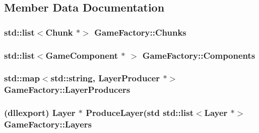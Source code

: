 \subsection{Member Data Documentation}
\hypertarget{class_game_factory_a77496a7ea1e2fa54acb18c499b3bd3bb}{
\subsubsection[{Chunks}]{\setlength{\rightskip}{0pt plus 5cm}std\-::list$<${\bf Chunk} $\ast$$>$ Game\-Factory\-::\-Chunks\hspace{0.3cm}{\ttfamily [private]}}}\label{class_game_factory_a77496a7ea1e2fa54acb18c499b3bd3bb}
\hypertarget{class_game_factory_a90fc6360610babaf3d2d880f782772b3}{
\subsubsection[{Components}]{\setlength{\rightskip}{0pt plus 5cm}std\-::list$<${\bf Game\-Component} $\ast$ $>$ Game\-Factory\-::\-Components\hspace{0.3cm}{\ttfamily [private]}}}\label{class_game_factory_a90fc6360610babaf3d2d880f782772b3}
\hypertarget{class_game_factory_adfadca1996a3982f4b45c67ced1520f2}{
\subsubsection[{Layer\-Producers}]{\setlength{\rightskip}{0pt plus 5cm}std\-::map$<$std\-::string, {\bf Layer\-Producer} $\ast$$>$ Game\-Factory\-::\-Layer\-Producers\hspace{0.3cm}{\ttfamily [private]}}}\label{class_game_factory_adfadca1996a3982f4b45c67ced1520f2}
\hypertarget{class_game_factory_aeb0d338957100663811acae5074943ac}{
\subsubsection[{Layers}]{ (dllexport) {\bf Layer} $\ast$ Produce\-Layer(std std\-::list$<${\bf Layer} $\ast$$>$ Game\-Factory\-::\-Layers\hspace{0.3cm}{\ttfamily [private]}}}\label{class_game_factory_aeb0d338957100663811acae5074943ac}
